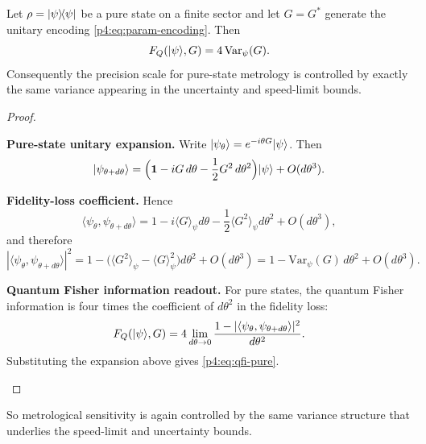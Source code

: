 \documentclass[12pt,a4paper]{article}
\begin{document}
\begin{theorem}
\label{p4:thm:pure-qfi}
Let \(\rho=\lvert \psi \rangle\!\langle \psi \rvert\) be a pure state on a finite sector and let \(G=G^*\) generate the unitary encoding \eqref{p4:eq:param-encoding}.
Then
\begin{equation}
\label{p4:eq:qfi-pure}
F_Q(\lvert \psi \rangle,G)=4\,\mathrm{Var}_{\psi}(G).
\end{equation}
Consequently the precision scale for pure-state metrology is controlled by exactly the same variance appearing in the uncertainty and speed-limit bounds.
\end{theorem}


\begin{proof}
\begin{proofsteps}

\item \textbf{Pure-state unitary expansion.}
Write \(\lvert \psi_\theta \rangle=e^{-i\theta G}\lvert \psi \rangle\).
Then
\[
\lvert \psi_{\theta+d\theta} \rangle
=
\Bigl(
\mathbf 1-iG\,d\theta-\frac12G^2\,d\theta^2
\Bigr)\lvert \psi \rangle
+
O(d\theta^3).
\]

\item \textbf{Fidelity-loss coefficient.}
Hence
\[
\langle \psi_\theta,\psi_{\theta+d\theta}\rangle
=
1-i\langle G\rangle_\psi d\theta-\frac12\langle G^2\rangle_\psi d\theta^2+O(d\theta^3),
\]
and therefore
\[
|\langle \psi_\theta,\psi_{\theta+d\theta}\rangle|^2
=
1-\bigl(\langle G^2\rangle_\psi-\langle G\rangle_\psi^2\bigr)d\theta^2+O(d\theta^3)
=
1-\mathrm{Var}_\psi(G)\,d\theta^2+O(d\theta^3).
\]

\item \textbf{Quantum Fisher information readout.}
For pure states, the quantum Fisher information is four times the coefficient of \(d\theta^2\) in the fidelity loss:
\[
F_Q(\lvert \psi \rangle,G)
=
4\lim_{d\theta\to 0}
\frac{1-|\langle \psi_\theta,\psi_{\theta+d\theta}\rangle|^2}{d\theta^2}.
\]
Substituting the expansion above gives \eqref{p4:eq:qfi-pure}.
\end{proofsteps}

\end{proof}

So metrological sensitivity is again controlled by the same variance structure that underlies the speed-limit and uncertainty bounds.
\end{document}
